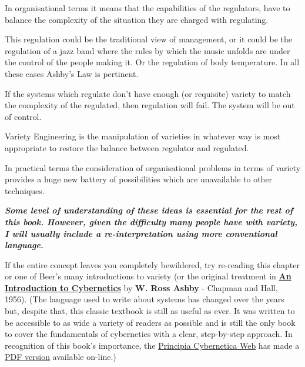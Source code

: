 In organisational terms it means that the capabilities of the regulators, have to balance the complexity of the situation they are charged with regulating.

This regulation could be the traditional view of management, or it could be the regulation of a jazz band where the rules by which the music unfolds are under the control of the people making it. Or the regulation of body temperature. In all these cases Ashby's Law is pertinent.

If the systems which regulate don't have enough (or requisite) variety to match the complexity of the regulated, then regulation will fail. The system will be out of control.

Variety Engineering is the manipulation of varieties in whatever way is most appropriate to restore the balance between regulator and regulated.

In practical terms the consideration of organisational problems in terms of variety provides a huge new battery of possibilities which are unavailable to other techniques.

\textit{\textbf{Some level of understanding of these ideas is essential for the rest of this book. However, given the difficulty many people have with variety, I will usually include a re-interpretation using more conventional language.}}

If the entire concept leaves you completely bewildered, try re-reading this chapter or one of Beer's many introductions to variety (or the original treatment in \textbf{\href{https://vsmg.lrc.org.uk/screen.php?page=bibliography}{An Introduction to Cybernetics}} by \textbf{W. Ross Ashby} - Chapman and Hall, 1956). (The language used to write about systems has changed over the years but, despite that, this classic textbook is still as useful as ever. It was written to be accessible to as wide a variety of readers as possible and is still the only book to cover the fundamentals of cybernetics with a clear, step-by-step approach. In recognition of this book's importance, the \href{http://pespmc1.vub.ac.be/}{Principia Cybernetica Web} has made a \href{http://pespmc1.vub.ac.be/ASHBBOOK.html}{PDF version} available on-line.)
